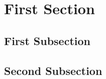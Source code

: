 \section{First Section}
\lipsum[30]
\subsection{First Subsection}
\lipsum[30]

\subsection{Second Subsection}


